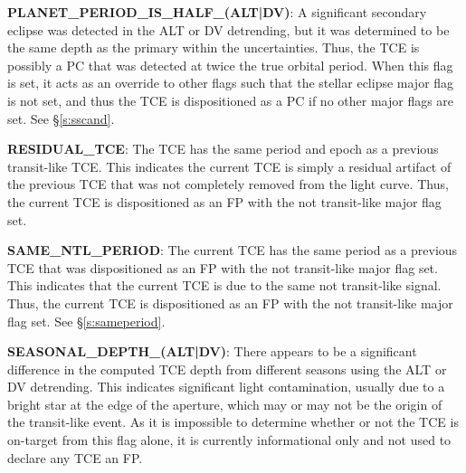 
\textbf{PLANET\_PERIOD\_IS\_HALF\_(ALT|DV)}: A significant secondary eclipse was detected in the ALT or DV detrending, but it was determined to be the same depth as the primary within the uncertainties. Thus, the TCE is possibly a PC that was detected at twice the true orbital period. When this flag is set, it acts as an override to other flags such that the stellar eclipse major flag is not set, and thus the TCE is dispositioned as a PC if no other major flags are set. See \S\ref{s:sscand}.


\textbf{RESIDUAL\_TCE}: The TCE has the same period and epoch as a previous transit-like TCE. This indicates the current TCE is simply a residual artifact of the previous TCE that was not completely removed from the light curve. Thus, the current TCE is dispositioned as an FP with the not transit-like major flag set.

\textbf{SAME\_NTL\_PERIOD}: The current TCE has the same period as a previous TCE that was dispositioned as an FP with the not transit-like major flag set. This indicates that the current TCE is due to the same not transit-like signal. Thus, the current TCE is dispositioned as an FP with the not transit-like major flag set. See \S\ref{s:sameperiod}.

\textbf{SEASONAL\_DEPTH\_(ALT|DV)}: There appears to be a significant difference in the computed TCE depth from different seasons using the ALT or DV detrending. This indicates significant light contamination, usually due to a bright star at the edge of the aperture, which may or may not be the origin of the transit-like event. As it is impossible to determine whether or not the TCE is on-target from this flag alone, it is currently informational only and not used to declare any TCE an FP.

